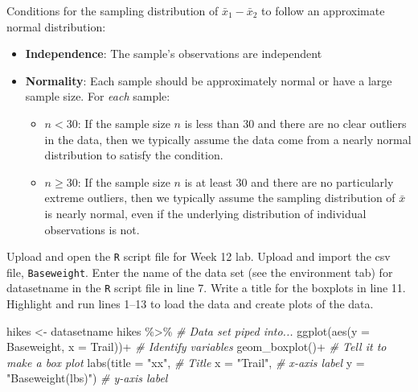 \documentclass[
]{report}
\newenvironment{Shaded}{\begin{snugshade}}{\end{snugshade}}
\newcommand{\AttributeTok}[1]{\textcolor[rgb]{0.77,0.63,0.00}{#1}}
\newcommand{\CommentTok}[1]{\textcolor[rgb]{0.56,0.35,0.01}{\textit{#1}}}
\newcommand{\FunctionTok}[1]{\textcolor[rgb]{0.00,0.00,0.00}{#1}}
\newcommand{\NormalTok}[1]{#1}
\newcommand{\OtherTok}[1]{\textcolor[rgb]{0.56,0.35,0.01}{#1}}
\newcommand{\SpecialCharTok}[1]{\textcolor[rgb]{0.00,0.00,0.00}{#1}}
\newcommand{\StringTok}[1]{\textcolor[rgb]{0.31,0.60,0.02}{#1}}
\begin{document}
Conditions for the sampling distribution of \(\bar{x}_1-\bar{x}_2\) to follow an approximate normal distribution:

\begin{itemize}
\item
  \textbf{Independence}: The sample's observations are independent
\item
  \textbf{Normality}: Each sample should be approximately normal or have a large sample size. For \emph{each} sample:

  \begin{itemize}
  \item
    \(n < 30\): If the sample size \(n\) is less than 30 and there are no clear outliers in the data, then we typically assume the data come from a nearly normal distribution to satisfy the condition.
  \item
    \(n \ge 30\): If the sample size \(n\) is at least 30 and there are no particularly extreme outliers, then we typically assume the sampling distribution of \(\bar{x}\) is nearly normal, even if the underlying distribution of individual observations is not.
  \end{itemize}
\end{itemize}

Upload and open the \texttt{R} script file for Week 12 lab. Upload and import the csv file, \texttt{Baseweight}. Enter the name of the data set (see the environment tab) for datasetname in the \texttt{R} script file in line 7. Write a title for the boxplots in line 11. Highlight and run lines 1--13 to load the data and create plots of the data.

\begin{Shaded}
\begin{Highlighting}[]
\NormalTok{hikes }\OtherTok{\textless{}{-}}\NormalTok{ datasetname}
\NormalTok{hikes }\SpecialCharTok{\%\textgreater{}\%}  \CommentTok{\# Data set piped into...}
  \FunctionTok{ggplot}\NormalTok{(}\FunctionTok{aes}\NormalTok{(}\AttributeTok{y =}\NormalTok{ Baseweight, }\AttributeTok{x =}\NormalTok{ Trail))}\SpecialCharTok{+}  \CommentTok{\# Identify variables}
  \FunctionTok{geom\_boxplot}\NormalTok{()}\SpecialCharTok{+}  \CommentTok{\# Tell it to make a box plot}
  \FunctionTok{labs}\NormalTok{(}\AttributeTok{title =} \StringTok{"xx"}\NormalTok{,  }\CommentTok{\# Title}
       \AttributeTok{x =} \StringTok{"Trail"}\NormalTok{,    }\CommentTok{\# x{-}axis label}
       \AttributeTok{y =} \StringTok{"Baseweight(lbs)"}\NormalTok{)  }\CommentTok{\# y{-}axis label}
\end{Highlighting}
\end{Shaded}
\end{document}
